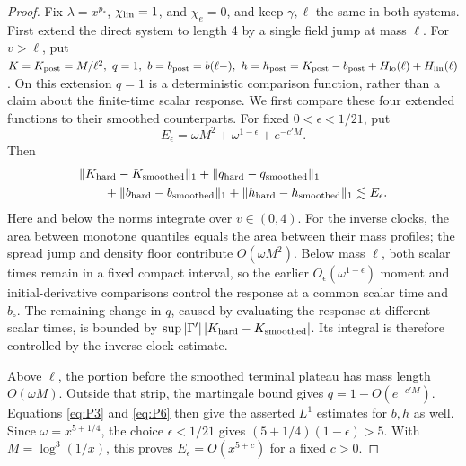 \begin{proof}
Fix \(\lambda=x^{p_*}\), \(\chi_{\rm lin}=1\), and \(\chi_e=0\),
and keep \(\gamma,\ell\) the same in both systems. First extend the
direct system to length 4 by a single field jump at mass \(\ell\).
For \(v>\ell\), put \(K=K_{\rm post}=M/\ell^2,\ q=1,\ b=b_{\rm post}=b(\ell-),\ h=h_{\rm post}=K_{\rm post}-b_{\rm post}+H_{\rm lo}(\ell)+H_{\rm lin}(\ell)\). On this extension \(q=1\) is a deterministic comparison function,
rather than a claim about the finite-time scalar response. We first
compare these four extended functions to their smoothed counterparts.
For fixed \(0<\epsilon<1/21\), put
\[
 E_\epsilon=\omega M^2+\omega^{1-\epsilon}+e^{-c'M}.
\]
Then
\[
 \begin{split}
 &\|K_{\rm hard}-K_{\rm smoothed}\|_1
 +\|q_{\rm hard}-q_{\rm smoothed}\|_1\\
 &\qquad+\|b_{\rm hard}-b_{\rm smoothed}\|_1
 +\|h_{\rm hard}-h_{\rm smoothed}\|_1
 \lesssim E_\epsilon.
 \end{split}
\]
Here and below the norms integrate over \(v\in(0,4)\).
For the inverse clocks,
the area between monotone quantiles equals the area between their
mass profiles; the spread jump and density floor contribute
\(O(\omega M^2)\). Below mass \(\ell\), both scalar times remain
in a fixed compact interval, so the earlier
\(O_\epsilon(\omega^{1-\epsilon})\) moment and initial-derivative
comparisons control the response at a common scalar time and
\(b_\circ\). The remaining change in \(q\), caused by evaluating
the response at different scalar times, is bounded by
\(\sup|\Gamma'|\,|K_{\rm hard}-K_{\rm smoothed}|\). Its integral
is therefore controlled by the inverse-clock estimate.

Above \(\ell\), the portion before the smoothed terminal plateau has
mass length \(O(\omega M)\). Outside that strip, the martingale bound
gives \(q=1-O(e^{-c'M})\). Equations \eqref{eq:P3} and \eqref{eq:P6}
then give the asserted \(L^1\) estimates for \(b,h\) as well.
Since \(\omega=x^{5+1/4}\), the choice \(\epsilon<1/21\) gives
\((5+1/4)(1-\epsilon)>5\). With \(M=\log^3(1/x)\), this proves
\(E_\epsilon=O(x^{5+c})\) for a fixed \(c>0\).


\end{proof}
